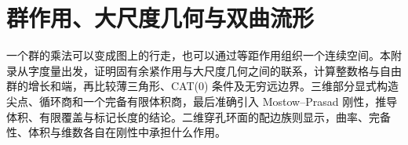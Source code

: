
% 
% 
% 
% 
% 
% 
% 
% 

\chapter{群作用、大尺度几何与双曲流形}
\label{g3:app:D}

\begin{chapterabstract}
	一个群的乘法可以变成图上的行走，也可以通过等距作用组织一个连续空间。本附录从字度量出发，证明固有余紧作用与大尺度几何之间的联系，计算整数格与自由群的增长和端，再比较薄三角形、CAT(0) 条件及无穷远边界。三维部分显式构造尖点、循环商和一个完备有限体积商，最后准确引入 Mostow--Prasad 刚性，推导体积、有限覆盖与标记长度的结论。二维穿孔环面的配边族则显示，曲率、完备性、体积与维数各自在刚性中承担什么作用。
\end{chapterabstract}

